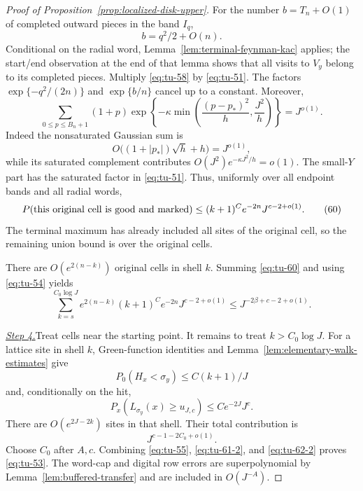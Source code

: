 \begin{proof}[Proof of Proposition~\ref{prop:localized-disk-upper}]
For the number \(b=T_n+O(1)\) of completed outward pieces in the band
\(I_q\),
\[
       b=q^2/2+O(n).
\]
Conditional on the radial word, Lemma~\ref{lem:terminal-feynman-kac} applies;
the start/end observation at the end of that lemma shows that all visits
to \(V_y\) belong to its completed pieces.  Multiply
\eqref{eq:tu-58} by \eqref{eq:tu-51}.  The factors
\(\exp\{-q^2/(2n)\}\) and \(\exp\{b/n\}\) cancel up to a constant.
Moreover,
\begin{equation}
 \sum_{0\le p\le B_n+1}(1+p)
 \exp\left\{-\kappa\min\left(
          \frac{(p-p_*)^2}{h},\frac{J^2}{h}\right)\right\}
       =J^{o(1)}.                                             \tag{59}\label{eq:tu-59}
\end{equation}
Indeed the nonsaturated Gaussian sum is
\[
 O\bigl((1+|p_*|)\sqrt h+h\bigr)=J^{o(1)},
\]
while its saturated complement contributes
\(O(J^2)e^{-\kappa J^2/h}=o(1)\).  The small-\(Y\) part has the
saturated factor in \eqref{eq:tu-51}.  Thus, uniformly
over all endpoint bands and all radial words,
\begin{equation}
 P(\hbox{this original cell is good and marked})
       \le (k+1)^Ce^{-2n}J^{c-2+o(1)}.                        \tag{60}\label{eq:tu-60}
\end{equation}
The terminal maximum has already included all sites of the original
cell, so the remaining union bound is over the original cells.

There are \(O(e^{2(n-k)})\) original cells in shell \(k\).  Summing \eqref{eq:tu-60}
and using \eqref{eq:tu-54} yields
\begin{equation}
 \sum_{k=s}^{C_0\log J}e^{2(n-k)}
       (k+1)^Ce^{-2n}J^{c-2+o(1)}
       \le J^{-2\beta+c-2+o(1)}.                              \tag{61}\label{eq:tu-61-2}
\end{equation}

\smallskip\noindent
\underline{\textit{Step 4.}}\quad Treat cells near the starting point.
It remains to treat \(k>C_0\log J\). For a lattice site in shell \(k\),
Green-function identities and Lemma~\ref{lem:elementary-walk-estimates} give
\[
 P_0(H_x<\sigma_y)\le C(k+1)/J
\]
and, conditionally on the hit,
\[
 P_x(L_{\sigma_y}(x)\ge u_{J,c})
       \le Ce^{-2J}J^c.
\]
There are \(O(e^{2J-2k})\) sites in that shell.  Their total contribution
is
\begin{equation}
       J^{c-1-2C_0+o(1)}.                                    \tag{62}\label{eq:tu-62-2}
\end{equation}
Choose \(C_0\) after \(A,c\).  Combining \eqref{eq:tu-55}, \eqref{eq:tu-61-2}, and \eqref{eq:tu-62-2} proves
\eqref{eq:tu-53}.  The word-cap and digital row errors are superpolynomial by
Lemma~\ref{lem:buffered-transfer} and are included in \(O(J^{-A})\).
\end{proof}
